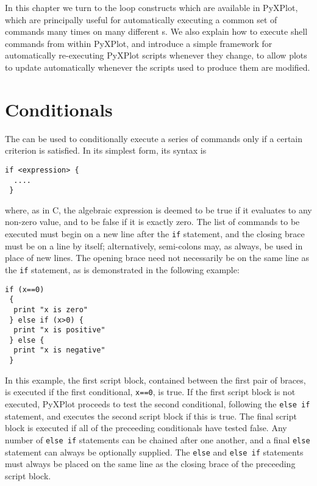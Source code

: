 In this chapter we turn to the loop constructs which are available in PyXPlot,
which are principally useful for automatically executing a common set of
commands many times on many different \datafile s. We also explain how to
execute shell commands from within PyXPlot, and introduce a simple framework
for automatically re-executing PyXPlot scripts whenever they change, to allow
plots to update automatically whenever the scripts used to produce them are
modified.

\section{Conditionals}

The  can be used to conditionally execute a series of commands only
if a certain criterion is satisfied. In its simplest form, its syntax is

\begin{verbatim}
if <expression> {
  ....
 }
\end{verbatim}

\noindent where, as in C, the algebraic expression is deemed to be true if it
evaluates to any non-zero value, and to be false if it is exactly zero. The
list of commands to be executed must begin on a new line after the {\tt if}
statement, and the closing brace must be on a line by itself; alternatively,
semi-colons may, as always, be used in place of new lines. The opening brace
need not necessarily be on the same line as the {\tt if} statement, as is
demonstrated in the following example:

\begin{verbatim}
if (x==0)
 {
  print "x is zero"
 } else if (x>0) {
  print "x is positive"
 } else {
  print "x is negative"
 }
\end{verbatim}

In this example, the first script block, contained between the first pair of
braces, is executed if the first conditional, {\tt x==0}, is true. If the first
script block is not executed, PyXPlot proceeds to test the second conditional,
following the {\tt else if} statement, and executes the second script block if
this is true. The final script block is executed if all of the preceeding
conditionals have tested false. Any number of {\tt else if} statements can be
chained after one another, and a final {\tt else} statement can always be
optionally supplied. The {\tt else} and {\tt else if} statements must always be
placed on the same line as the closing brace of the preceeding script block.


